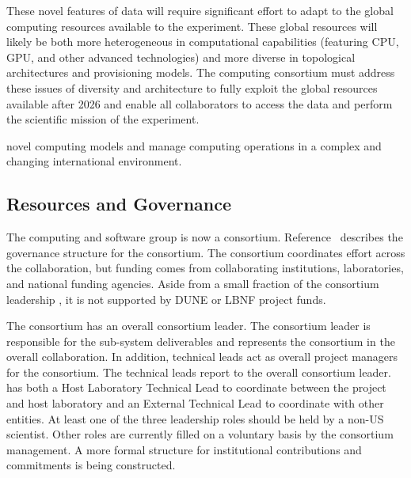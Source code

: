 These novel features of  data will require significant effort to adapt to the global computing resources available to the experiment.  These global resources will  likely be both more heterogeneous in computational capabilities (featuring CPU, GPU, and other advanced technologies) and more diverse in topological architectures and provisioning models.  The  computing consortium must address these issues of diversity and architecture to fully exploit the global resources available after 2026 and enable all collaborators to access the data and perform the scientific mission of the experiment.  

novel computing models and manage computing operations in a complex and changing international environment.  




\subsection{Resources and Governance}
\label{ch:exec-comp-gov}

The computing and software group is now a  consortium.  Reference~\cite{bib:docdb12751} describes the governance structure for the consortium.  The consortium coordinates effort across the collaboration, but funding comes from collaborating institutions, laboratories, and national funding agencies. Aside from a small fraction of the consortium leadership , it is not supported by DUNE or LBNF project funds.  

The consortium has an overall consortium leader. The consortium leader is responsible for the sub-system deliverables and represents the consortium in the overall  collaboration.
In addition, technical leads act as overall project managers for the consortium. The technical leads report to the overall consortium leader.
 has both a Host Laboratory Technical Lead to coordinate between the  project and host laboratory and an External Technical Lead to coordinate with other entities.
At least one of the three leadership roles should be held by a non-US scientist. 
Other roles are currently filled on a voluntary basis by the consortium management.  A more formal structure for institutional contributions and commitments is being constructed. 


